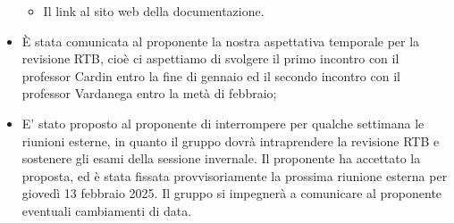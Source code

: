 \begin{itemize}
\begin{itemize}
        \item Il link al sito web della documentazione.
    \end{itemize}
    \item È stata comunicata al proponente la nostra aspettativa temporale per la revisione RTB, cioè ci aspettiamo di svolgere
    il primo incontro con il professor Cardin entro la fine di gennaio ed il secondo incontro con il professor Vardanega entro
    la metà di febbraio;
    \item E' stato proposto al proponente di interrompere per qualche settimana le riunioni esterne, in quanto il gruppo
    dovrà intraprendere la revisione RTB e sostenere gli esami della sessione invernale. Il proponente ha accettato la proposta,
    ed è stata fissata provvisoriamente la prossima riunione esterna per giovedì 13 febbraio 2025. Il gruppo si impegnerà
    a comunicare al proponente eventuali cambiamenti di data.
\end{itemize}